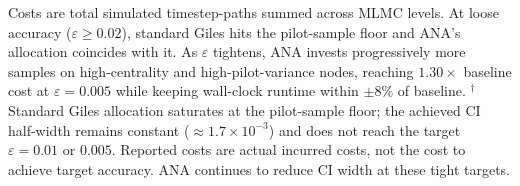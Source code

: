 \documentclass{ieeeaccess}
\begin{document}
\begin{table}[!t]
\caption{ANA-MLMC vs.\ Standard Giles Allocation (Barabasi-Albert $n=500$,
         $m=3$, NVIDIA T4, 5-seed mean$\pm$SD). For $\varepsilon$ = 0.01 and 0.005, the baseline does not meet the target RMS error (CI width is $\approx 2\times$ larger); the comparison is therefore not equal‑accuracy, but shows the additional cost ANA incurs to achieve further CI reduction.}
\label{tab:ana_mlmc}
\centering
{}
\vspace{2pt}\footnotesize Costs are total simulated timestep-paths summed across MLMC levels. At loose accuracy ($\varepsilon\!\ge\!0.02$), standard Giles hits the pilot-sample floor and ANA's allocation coincides with it. As $\varepsilon$ tightens, ANA invests progressively more samples on high-centrality and high-pilot-variance nodes, reaching $1.30\times$ baseline cost at $\varepsilon=0.005$ while keeping wall-clock runtime within $\pm 8\%$ of baseline.
$^\dagger$Standard Giles allocation saturates at the pilot-sample floor; the achieved CI half-width remains constant ($\approx 1.7\times10^{-3}$) and does not reach the target $\varepsilon=0.01$ or $0.005$. Reported costs are actual incurred costs, not the cost to achieve target accuracy. ANA continues to reduce CI width at these tight targets.
\end{table}
\end{document}

